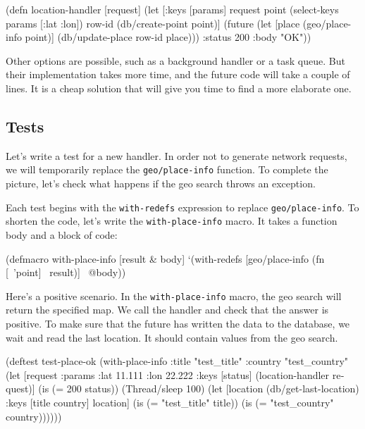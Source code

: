 \else

\begin{english}
  \begin{clojure}
(defn location-handler
  [request]
  (let [{:keys [params]} request
        point (select-keys params [:lat :lon])
        row-id (db/create-point point)]
    (future
      (let [place (geo/place-info point)]
        (db/update-place row-id place)))
    {:status 200 :body "OK"}))
  \end{clojure}
\end{english}

\fi

Other options are possible, such as a background handler or a task queue.  But
their implementation takes more time, and the future code will take a couple of
lines. It is a cheap solution that will give you time to find a more elaborate
one.

\subsection{Tests}


Let's write a test for a new handler. In order not to generate network requests,
we will temporarily replace the \verb|geo/place-info| function. To complete the
picture, let's check what happens if the geo search throws an exception.

Each test begins with the \verb|with-redefs| expression to replace \verb|geo/place-info|.
To shorten the code, let's write the \verb|with-place-info| macro.
It takes a function body and a block of code:

\begin{english}
  \begin{clojure}
(defmacro with-place-info
  [result & body]
  `(with-redefs [geo/place-info
                 (fn [~'point] ~result)]
     ~@body))
  \end{clojure}
\end{english}

Here's a positive scenario. In the \verb|with-place-info| macro, the geo search
will return the specified map. We call the handler and check that the answer is
positive. To make sure that the future has written the data to the database, we
wait and read the last location. It should contain values from the geo search.

\ifx\DEVICETYPE\MOBILE

\begin{english}
  \begin{clojure}
(deftest test-place-ok
  (with-place-info
    {:title "test_title"
     :country "test_country"}
    (let [request {:params
                   {:lat 11.111
                    :lon 22.222}}
          {:keys [status]}
          (location-handler request)]
      (is (= 200 status))
      (Thread/sleep 100)
      (let [location
            (db/get-last-location)
            {:keys [title country]}
            location]
        (is (= "test_title" title))
        (is (= "test_country"
               country))))))
  \end{clojure}
\end{english}

